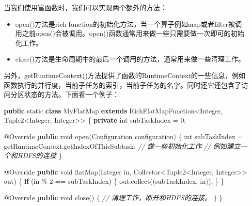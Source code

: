 \documentclass[cn,11pt,chinese]{elegantbook}
\newenvironment{Shaded}{}{}
\newcommand{\AttributeTok}[1]{\textcolor[rgb]{0.49,0.56,0.16}{#1}}
\newcommand{\BuiltInTok}[1]{#1}
\newcommand{\CommentTok}[1]{\textcolor[rgb]{0.38,0.63,0.69}{\textit{#1}}}
\newcommand{\DataTypeTok}[1]{\textcolor[rgb]{0.56,0.13,0.00}{#1}}
\newcommand{\DecValTok}[1]{\textcolor[rgb]{0.25,0.63,0.44}{#1}}
\newcommand{\FunctionTok}[1]{\textcolor[rgb]{0.02,0.16,0.49}{#1}}
\newcommand{\KeywordTok}[1]{\textcolor[rgb]{0.00,0.44,0.13}{\textbf{#1}}}
\newcommand{\NormalTok}[1]{#1}
\providecommand{\tightlist}{%
  \setlength{\itemsep}{0pt}\setlength{\parskip}{0pt}}
\begin{document}
当我们使用富函数时，我们可以实现两个额外的方法：

\begin{itemize}
\tightlist
\item
  open()方法是rich
  function的初始化方法，当一个算子例如map或者filter被调用之前open()会被调用。open()函数通常用来做一些只需要做一次即可的初始化工作。
\item
  close()方法是生命周期中的最后一个调用的方法，通常用来做一些清理工作。
\end{itemize}

另外，getRuntimeContext()方法提供了函数的RuntimeContext的一些信息，例如函数执行的并行度，当前子任务的索引，当前子任务的名字。同时还它还包含了访问分区状态的方法。下面看一个例子：

\begin{Shaded}
\begin{Highlighting}[]
\KeywordTok{public} \DataTypeTok{static} \KeywordTok{class}\NormalTok{ MyFlatMap }\KeywordTok{extends}\NormalTok{ RichFlatMapFunction\textless{}}\BuiltInTok{Integer}\NormalTok{, Tuple2\textless{}}\BuiltInTok{Integer}\NormalTok{, }\BuiltInTok{Integer}\NormalTok{\textgreater{}\textgreater{} \{}
  \KeywordTok{private} \DataTypeTok{int}\NormalTok{ subTaskIndex = }\DecValTok{0}\NormalTok{;}

  \AttributeTok{@Override}
  \KeywordTok{public} \DataTypeTok{void} \FunctionTok{open}\NormalTok{(}\BuiltInTok{Configuration}\NormalTok{ configuration) \{}
    \DataTypeTok{int}\NormalTok{ subTaskIndex = getRuntimeContext.}\FunctionTok{getIndexOfThisSubtask}\NormalTok{;}
    \CommentTok{// 做一些初始化工作}
    \CommentTok{// 例如建立一个和HDFS的连接}
\NormalTok{  \}}

  \AttributeTok{@Override}
  \KeywordTok{public} \DataTypeTok{void} \FunctionTok{flatMap}\NormalTok{(}\BuiltInTok{Integer}\NormalTok{ in, Collector\textless{}Tuple2\textless{}}\BuiltInTok{Integer}\NormalTok{, }\BuiltInTok{Integer}\NormalTok{\textgreater{}\textgreater{} out) \{}
    \KeywordTok{if}\NormalTok{ (in \% }\DecValTok{2}\NormalTok{ == subTaskIndex) \{}
\NormalTok{      out.}\FunctionTok{collect}\NormalTok{((subTaskIndex, in));}
\NormalTok{    \}}
\NormalTok{  \}}

  \AttributeTok{@Override}
  \KeywordTok{public} \DataTypeTok{void} \FunctionTok{close}\NormalTok{() \{}
    \CommentTok{// 清理工作，断开和HDFS的连接。}
\NormalTok{  \}}
\NormalTok{\}}
\end{Highlighting}
\end{Shaded}
\end{document}
